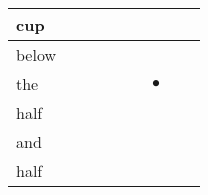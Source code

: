 \documentclass[landscape]{article}
\newcommand{\ssp}{\hspace{2pt}}
\newcommand{\mex}{\cellcolor{g}$\bullet$}
\begin{document}
\begin{tabular}{|l|p{10pt}|p{10pt}|p{10pt}|p{10pt}|p{10pt}|p{10pt}|p{10pt}|p{10pt}|}
\hline
\ssp cup \ssp&\hspace{2pt}&\hspace{2pt}&\hspace{2pt}&\hspace{2pt}&\hspace{2pt}&\hspace{2pt}&\hspace{2pt}&\hspace{2pt}\\
\hline
\ssp below \ssp&\hspace{2pt}&\hspace{2pt}&\hspace{2pt}&\hspace{2pt}&\hspace{2pt}&\hspace{2pt}&\hspace{2pt}&\hspace{2pt}\\
\hline
\ssp \cellcolor{ref5}the \ssp&\hspace{2pt}&\hspace{2pt}&\hspace{2pt}&\hspace{2pt}&\hspace{2pt}&\hspace{2pt}\mex&\hspace{2pt}&\hspace{2pt}\\
\hline
\ssp half \ssp&\hspace{2pt}&\hspace{2pt}&\hspace{2pt}&\hspace{2pt}&\hspace{2pt}&\hspace{2pt}&\hspace{2pt}&\hspace{2pt}\\
\hline
\ssp and \ssp&\hspace{2pt}&\hspace{2pt}&\hspace{2pt}&\hspace{2pt}&\hspace{2pt}&\hspace{2pt}&\hspace{2pt}&\hspace{2pt}\\
\hline
\ssp half \ssp&\hspace{2pt}&\hspace{2pt}&\hspace{2pt}&\hspace{2pt}&\hspace{2pt}&\hspace{2pt}&\hspace{2pt}&\hspace{2pt}\\

\end{tabular}
\end{document}
